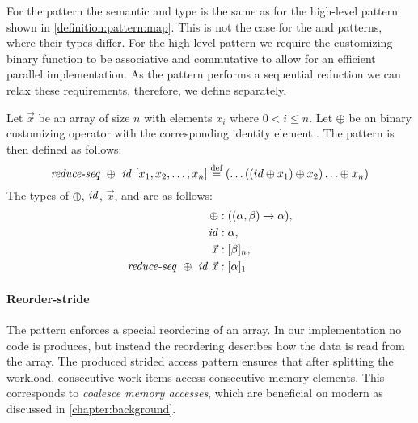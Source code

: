 For the \mapSeq pattern the semantic and type is the same as for the high-level \map pattern shown in \autoref{definition:pattern:map}.
This is not the case for the \reduceSeq and \reduce patterns, where their types differ.
For the high-level \reduce pattern we require the customizing binary function to be associative and commutative to allow for an efficient parallel implementation.
As the \reduceSeq pattern performs a sequential reduction we can relax these requirements, therefore, we define \reduceSeq separately.
\begin{definition}
  \label{definition:pattern:reduceSeq}
  Let $\vec{x}$ be an array of size $n$ with elements $x_i$ where $0 < i \leq n$.
  Let $\oplus$ be an binary customizing operator with the corresponding identity element \id.
  The \reduceSeq pattern is then defined as follows:
  \begin{equation*}
    \text{\textit{reduce-seq}}\ \oplus\ \text{\textit{id}}\ [x_1, x_2, \dots, x_n]
      \stackrel{\textrm{\scriptsize def}}{=} (\dots((id \oplus x_1) \oplus x_2) \ldots \oplus x_n)
  \end{equation*}
  The types of $\oplus$, $\text{\textit{id}}$, $\vec{x}$, and \reduce are as follows:
  \begin{align*}
    \oplus &: ((\alpha, \beta) \rightarrow \alpha),\\
    \text{\textit{id}} &: \alpha,\\
    \vec{x} &: [\beta]_n,\\
    \text{\textit{reduce-seq}}\ \oplus\ \text{\textit{id}}\ \vec{x} &: [\alpha]_1
  \end{align*}
\end{definition}


\paragraph{Reorder-stride}
The \reorderStride pattern enforces a special reordering of an array.
In our implementation no code is produces, but instead the reordering describes how the data is read from the array.
The produced strided access pattern ensures that after splitting the workload, consecutive work-items access consecutive memory elements.
This corresponds to \emph{coalesce memory accesses}, which are beneficial on modern \GPUs as discussed in \autoref{chapter:background}.

